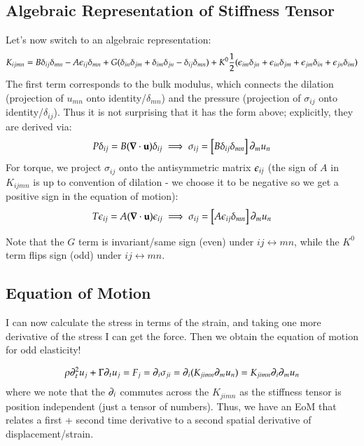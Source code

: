 \subsection{Algebraic Representation of Stiffness Tensor}
Let's now switch to an algebraic representation:
\begin{equation}
    K_{ijmn} = B\delta_{ij}\delta_{mn} - A\epsilon_{ij}\delta_{mn} + G(\delta_{in}\delta_{jm} + \delta_{im}\delta_{jn} - \delta_{ij}\delta_{mn}) + K^0 \frac{1}{2}(\epsilon_{im}\delta_{jn} + \epsilon_{in}\delta_{jm} + \epsilon_{jm}\delta_{in} + \epsilon_{jn}\delta_{im})
\end{equation}
The first term corresponds to the bulk modulus, which connects the dilation (projection of $u_{mn}$ onto identity/$\delta_{mn}$) and the pressure (projection of $\sigma_{ij}$ onto identity/$\delta_{ij}$). Thus it is not surprising that it has the form above; explicitly, they are derived via:
\begin{equation}
    P\delta_{ij} = B(\nabla \cdot \v{u})\delta_{ij} \implies \sigma_{ij} = \left[B\delta_{ij}\delta_{mn}\right]\p_m u_n
\end{equation}
For torque, we project $\sigma_{ij}$ onto the antisymmetric matrix $\epsilon_{ij}$ (the sign of $A$ in $K_{ijmn}$ is up to convention of dilation - we choose it to be negative so we get a positive sign in the equation of motion):
\begin{equation}
    T\e_{ij} = A(\nabla \cdot \v{u})\e_{ij} \implies \sigma_{ij} = \left[A\e_{ij}\delta_{mn}\right]\p_m u_n
\end{equation}

Note that the $G$ term is invariant/same sign (even) under $ij \leftrightarrow mn$, while the $K^0$ term flips sign (odd) under $ij \leftrightarrow mn$.

\subsection{Equation of Motion}
I can now calculate the stress in terms of the strain, and taking one more derivative of the stress I can get the force. Then we obtain the equation of motion for odd elasticity!

\begin{equation}
    \rho \partial_t^2 u_j + \Gamma \partial_t u_j = F_j = \partial_i \sigma_{ji} = \partial_i (K_{jimn} \partial_m u_n ) = K_{jimn}\partial_i \partial_m u_n
\end{equation}
where we note that the $\partial_i$ commutes across the $K_{jimn}$ as the stiffness tensor is position independent (just a tensor of numbers). Thus, we have an EoM that relates a first + second time derivative to a second spatial derivative of displacement/strain.

